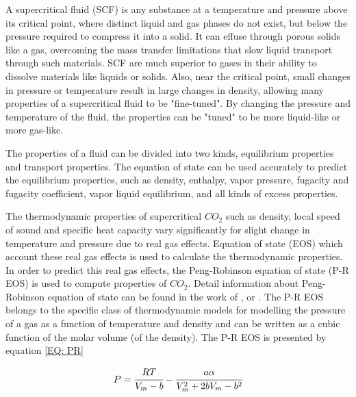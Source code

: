 \documentclass[../Article_Model_Parameters.tex]{subfiles}
\begin{document}
    A supercritical fluid (SCF) is any substance at a temperature and pressure above its critical point, where distinct liquid and gas phases do not exist, but below the pressure required to compress it into a solid. It can effuse through porous solids like a gas, overcoming the mass transfer limitations that slow liquid transport through such materials. SCF are much superior to gases in their ability to dissolve materials like liquids or solids. Also, near the critical point, small changes in pressure or temperature result in large changes in density, allowing many properties of a supercritical fluid to be "fine-tuned". By changing the pressure and temperature of the fluid, the properties can be "tuned" to be more liquid-like or more gas-like. 
    

    The properties of a fluid can be divided into two kinds, equilibrium properties and transport properties. The equation of state can be used accurately to predict the equilibrium properties, such as density, enthalpy, vapor pressure, fugacity and fugacity coefficient, vapor liquid equilibrium, and all kinds of excess properties.
    
    The thermodynamic properties of supercritical $CO_2$ such as density, local speed of sound and specific heat capacity vary significantly for slight change in temperature and pressure due to real gas effects. Equation of state (EOS) which account these real gas effects is used to calculate the thermodynamic properties. In order to predict this real gas effects, the Peng-Robinson equation of state (P-R EOS) is used to compute properties of $CO_2$. Detail information about Peng-Robinson equation of state can be found in the work of \citet{Peng1976}, \citet{Elliott2011} or \citet{Pratt2001}. The P-R EOS belongs to the specific class of thermodynamic models for modelling the pressure of a gas as a function of temperature and density and can be written as a cubic function of the molar volume (of the density). The P-R EOS is presented by equation \ref{EQ: PR}

    {\footnotesize
        \begin{equation}
            P = \cfrac{RT}{V_m - b} - \cfrac{a\alpha}{V_m^2 + 2bV_m - b^2}
            \label{EQ: PR}
        \end{equation}
    }
\end{document}
